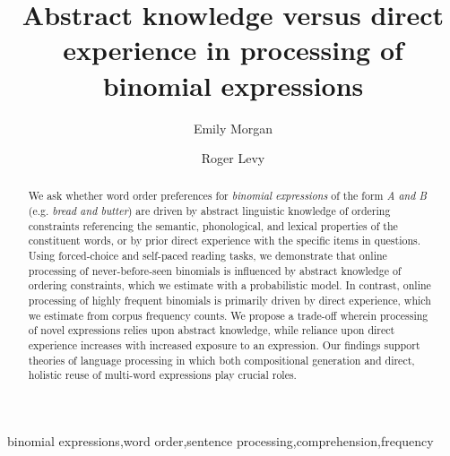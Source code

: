 \documentclass[authoryear]{elsarticle}
\begin{document}


\begin{frontmatter}
\title{Abstract knowledge versus direct experience in processing of binomial expressions}

\author[ucsd,tufts]{Emily Morgan}
\author[ucsd,mit]{Roger Levy}

\address[ucsd]{Department of Linguistics, University of California at San Diego, 9500 Gilman Drive, La Jolla, CA 92093-0108, United States}

\address[tufts]{Department of Psychology, Tufts University, 490 Boston Ave, Medford, MA 02155, United States}
\address[mit]{Department of Brain and Cognitive Sciences, Massachusetts Institute of Technology, 77 Massachusetts Avenue, Cambridge, MA 02139-4307, United States}




\begin{abstract}
We ask whether word order preferences for \emph{binomial expressions} of the form \emph{A and B} (e.g. \emph{bread and butter}) are driven by abstract linguistic knowledge of ordering constraints referencing the semantic, phonological, and lexical properties of the constituent words, or by prior direct experience with the specific items in questions. Using forced-choice and self-paced reading tasks, we demonstrate that online processing of never-before-seen binomials is influenced by abstract knowledge of ordering constraints, which we estimate with a probabilistic model. In contrast, online processing of highly frequent binomials is primarily driven by direct experience, which we estimate from corpus frequency counts. We propose a trade-off wherein processing of novel expressions relies upon abstract knowledge, while reliance upon direct experience increases with increased exposure to an expression. Our findings support theories of language processing in which both compositional generation and direct, holistic reuse of multi-word expressions play crucial roles.
\end{abstract}

\begin{keyword} binomial expressions\sep word order\sep sentence processing\sep comprehension\sep frequency \end{keyword}


\end{frontmatter}
\end{document}
